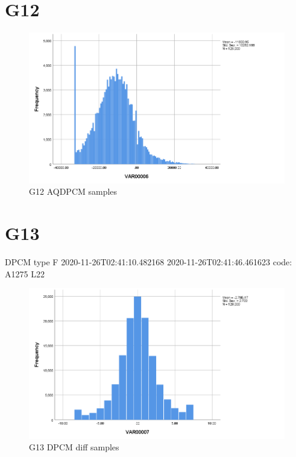 \documentclass[hidelinks, 12pt, a4paper]{article}
\begin{document}
\section{G12}

\begin{figure}[h!]
	\centering
		\includegraphics[height=.4\textheight, width=\textwidth]{assets/session1/g12.png}
		\caption{G12 AQDPCM  samples}
	\end{figure}

\section{G13}
DPCM type F
2020-11-26T02:41:10.482168
2020-11-26T02:41:46.461623
code: A1275 L22 
\begin{figure}[h!]
	\centering
		\includegraphics[height=.4\textheight, width=\textwidth]{assets/session1/g13.png}
		\caption{G13 DPCM diff samples}
	\end{figure}
\end{document}

